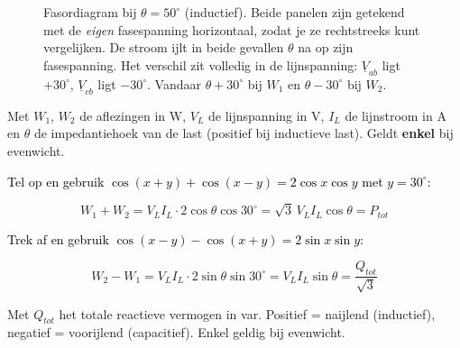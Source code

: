 \documentclass[a4paper,11pt]{article}
\newcommand{\stapreden}[1]{\par\vspace{1.4mm}\noindent\textcolor{black}{#1}\par\vspace{-2mm}}
\begin{document}
\begin{figure}[H]
    \caption{Fasordiagram bij $\theta = 50^\circ$ (inductief). Beide panelen zijn getekend met de
        \emph{eigen} fasespanning horizontaal, zodat je ze rechtstreeks kunt vergelijken. De stroom
        ijlt in beide gevallen $\theta$ na op zijn fasespanning. Het verschil zit volledig in de
        lijnspanning: $\underline{V}_{ab}$ ligt $+30^\circ$, $\underline{V}_{cb}$ ligt $-30^\circ$.
        Vandaar $\theta+30^\circ$ bij $W_1$ en $\theta-30^\circ$ bij $W_2$.}
    \label{fig:wattmeter-fasoren}
\end{figure}
\FloatBarrier

{Met $W_1$, $W_2$ de aflezingen in W, $V_L$ de lijnspanning in V, $I_L$ de lijnstroom in A en
    $\theta$ de impedantiehoek van de last (positief bij inductieve last). Geldt \textbf{enkel} bij
    evenwicht.}

\stapreden{Tel op en gebruik $\cos(x+y) + \cos(x-y) = 2\cos x\cos y$ met $y = 30^\circ$:}
\[W_1 + W_2 = V_L I_L \cdot 2\cos\theta\cos 30^\circ = \boxed{\sqrt{3}\,V_L I_L \cos\theta = P_{tot}}\]

\stapreden{Trek af en gebruik $\cos(x-y) - \cos(x+y) = 2\sin x\sin y$:}
\[W_2 - W_1 = V_L I_L \cdot 2\sin\theta\sin 30^\circ = V_L I_L \sin\theta
    = \frac{Q_{tot}}{\sqrt{3}}\]

{Met $Q_{tot}$ het totale reactieve vermogen in var. Positief = naijlend (inductief), negatief =
    voorijlend (capacitief). Enkel geldig bij evenwicht.}
\end{document}
